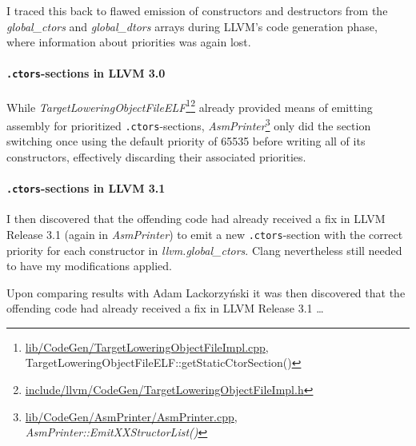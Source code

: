 I traced this back to flawed emission of constructors and destructors from the
\emph{global\_ctors} and \emph{global\_dtors} arrays during LLVM's code
generation phase, where information about priorities was again lost.


\paragraph{\texttt{.ctors}-sections in LLVM 3.0}

While
\emph{Target\-Lowering\-Object\-File\-ELF}\footnote{\url{lib/CodeGen/TargetLoweringObjectFileImpl.cpp},
TargetLoweringObjectFileELF::getStaticCtorSection()}\footnote{\url{include/llvm/CodeGen/TargetLoweringObjectFileImpl.h}}
already provided means of emitting assembly for prioritized
\texttt{.ctors}-sections,
\emph{Asm\-Printer}\footnote{\url{lib/CodeGen/AsmPrinter/AsmPrinter.cpp},
\emph{AsmPrinter::EmitXXStructorList()}} only did the section switching once
using the default priority of 65535 before writing all of its constructors,
effectively discarding their associated priorities.



\paragraph{\texttt{.ctors}-sections in LLVM 3.1}

I then discovered that the
offending code had already received
a fix in LLVM
Release 3.1 (again in \emph{AsmPrinter}) to emit a new \texttt{.ctors}-section
with the correct priority for each constructor
in \emph{llvm.global\_ctors}. Clang nevertheless still needed to have my
modifications applied.

\begin{leftbar}
  Upon comparing results with Adam Lackorzyński it was then discovered that the
  offending code had already received a fix in LLVM Release 3.1 …
\end{leftbar}


